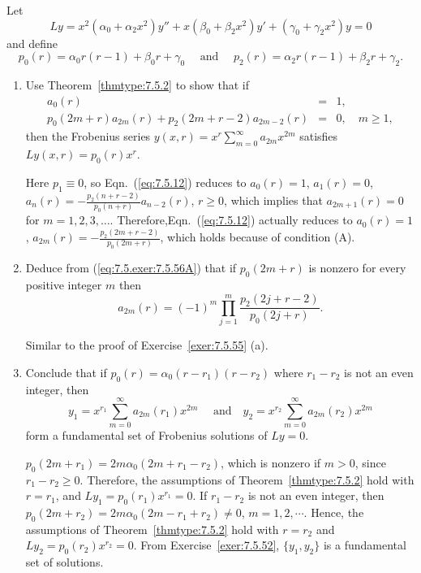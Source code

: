 \documentclass{ximera}
\begin{document}
\begin{problem}\label{exer:7.5.56}
Let
$$
Ly=x^2(\alpha_0+\alpha_2x^2)y''+x(\beta_0+\beta_2x^2)y'+
(\gamma_0+\gamma_2x^2)y=0
$$
and define
$$
p_0(r)=\alpha_0r(r-1)+\beta_0r+\gamma_0\quad\mbox{ and }\quad
p_2(r)=\alpha_2r(r-1)+\beta_2r+\gamma_2.
$$
\begin{enumerate}
\item %
Use Theorem~\ref{thmtype:7.5.2} to show that if
\begin{equation} \label{eq:7.5.exer:7.5.56A}
\begin{array}{rcl}
a_0(r)&=&1,\\
p_0(2m+r)a_{2m}(r)+p_2(2m+r-2)a_{2m-2}(r)&=&0,\quad m\geq 1,
\end{array}
\end{equation}
then the Frobenius series
 $y(x,r)=x^r\sum_{m=0}^\infty a_{2m}x^{2m}$ satisfies
$Ly(x,r)=p_0(r)x^r$.

\begin{solution}
    Here $p_1\equiv0$, so Eqn.~(\ref{eq:7.5.12}) reduces to
$a_0(r)=1$, $a_1(r)=0$, $a_n(r)=-\frac{p_2(n+r-2)}{
p_0(n+r)}a_{n-2}(r)$, $r\geq 0$, which implies that $a_{2m+1}(r)=0$
for $m=1,2,3,\dots$. Therefore,Eqn.~(\ref{eq:7.5.12}) actually reduces to
$a_0(r)=1$, $a_{2m}(r)=-\frac{p_2(2m+r-2)}{ p_0(2m+r)}$, which
holds because of condition (A).
\end{solution}

\item %
Deduce from (\ref{eq:7.5.exer:7.5.56A}) that  if $p_0(2m+r)$ is nonzero
for every positive integer $m$ then
$$
a_{2m}(r)=(-1)^m\prod_{j=1}^m\frac{p_2(2j+r-2)}{p_0(2j+r)}.
$$

\begin{solution}
    Similar to the proof of Exercise~\ref{exer:7.5.55} (a).
\end{solution}

\item %
Conclude that if $p_0(r)=\alpha_0(r-r_1)(r-r_2)$ where $r_1-r_2$
is not an even integer, then
$$
y_1=x^{r_1}\sum_{m=0}^\infty a_{2m}(r_1)x^{2m}\quad\mbox{ and
}\quad y_2=x^{r_2}\sum_{m=0}^\infty a_{2m}(r_2)x^{2m}
$$
form a fundamental set of  Frobenius solutions of $Ly=0$.

\begin{solution}
    $p_0(2m+r_1)=2m\alpha_0(2m+r_1-r_2)$,
which is nonzero if $m>0$, since $r_1-r_2\geq 0$. Therefore, the
assumptions of Theorem~\ref{thmtype:7.5.2} hold with $r=r_1$, and
$Ly_1=p_0(r_1)x^{r_1}=0$.
If $r_1-r_2$ is not an even integer, then
$p_0(2m+r_2)=2m\alpha_0(2m-r_1+r_2)\neq 0$, $m=1,2,\cdots$.
Hence, the assumptions of Theorem~\ref{thmtype:7.5.2} hold with $r=r_2$ and
 $Ly_2=p_0(r_2)x^{r_2}=0$.
From Exercise~\ref{exer:7.5.52},
$\{y_1,y_2\}$ is a fundamental set of solutions.
\end{solution}


\end{enumerate}
\end{problem}
\end{document}
